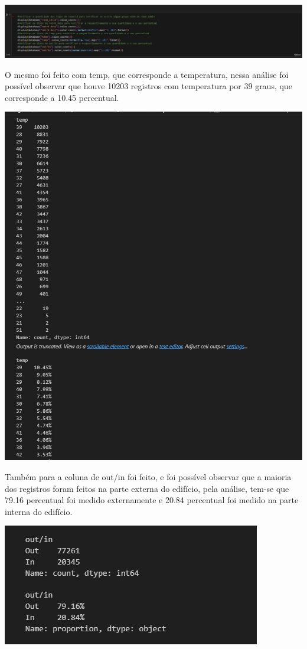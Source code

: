 \documentclass[a4paper, 12pt]{article}
\begin{document}
\includegraphics[scale=0.36]{img 03.jpg}

O mesmo foi feito com temp, que corresponde a temperatura, nessa análise foi possível observar que houve 10203 registros com temperatura por 39 graus, que corresponde a 10.45 percentual.

\includegraphics[scale=0.5]{img 05.jpg}

Também para a coluna de out/in foi feito, e foi possível observar que a maioria dos registros foram feitos na parte externa do edifício, pela análise, tem-se que 79.16 percentual foi medido externamente e 20.84 percentual foi medido na parte interna do edifício.


\includegraphics[scale=0.7]{img 06.jpg}
\end{document}
